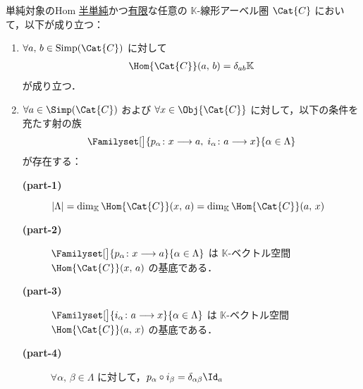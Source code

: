 \documentclass[TQFT_main]{subfiles}
\begin{document}
\begin{mylem}[label=lem:simple-hom,breakable]{単純対象のHom}
    \hyperref[def:semisimple-cat]{半単純}かつ\hyperref[def:finite-abcat]{有限}な任意の $\mathbb{K}$-線形アーベル圏 $\Cat{C}$ において，以下が成り立つ：
    \begin{enumerate}
        \item $\forall a,\, b \in \mathrm{Simp}(\Cat{C})$ に対して
        \begin{align}
            \Hom{\Cat{C}} (a,\, b) = \delta_{ab} \mathbb{K}
        \end{align}
        が成り立つ．
        \item $\forall a \in \Simp(\Cat{C})$ および $\forall x \in \Obj{\Cat{C}}$ に対して，以下の条件を充たす射の族
        \begin{align}
            \Familyset[\big]{p_\alpha \colon x \lto a,\; i_\alpha \colon a \lto x}{\alpha \in \Lambda}
        \end{align}
        が存在する：
        \begin{description}
            \item[\textbf{(part-1)}] $\abs{\Lambda} = \dim_{\mathbb{K}} \Hom{\Cat{C}} (x,\, a) = \dim_{\mathbb{K}} \Hom{\Cat{C}} (a,\, x)$
            \item[\textbf{(part-2)}] $\Familyset[\big]{p_\alpha \colon x \lto a}{\alpha \in \Lambda}$ は $\mathbb{K}$-ベクトル空間 $\Hom{\Cat{C}}(x,\, a)$ の基底である．
            \item[\textbf{(part-3)}] $\Familyset[\big]{i_\alpha \colon a \lto x}{\alpha \in \Lambda}$ は $\mathbb{K}$-ベクトル空間 $\Hom{\Cat{C}}(a,\, x)$ の基底である．
            \item[\textbf{(part-4)}] $\forall \alpha,\, \beta \in \Lambda$ に対して，$p_\alpha \circ i_\beta = \delta_{\alpha\beta} \Id_a$
        \end{description}
    \end{enumerate}
\end{mylem}
\end{document}
